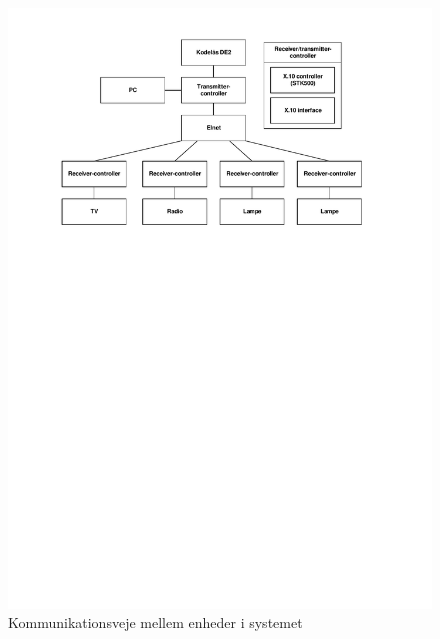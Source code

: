 \begin{figure}[h]
\centering
\includegraphics[scale=1,trim=50 535 80 30, clip=true]{../Projektformulering/kommunikation_diagram}
\caption{Kommunikationsveje mellem enheder i systemet}
\label{fig:kommunikation}
\end{figure}

\clearpage